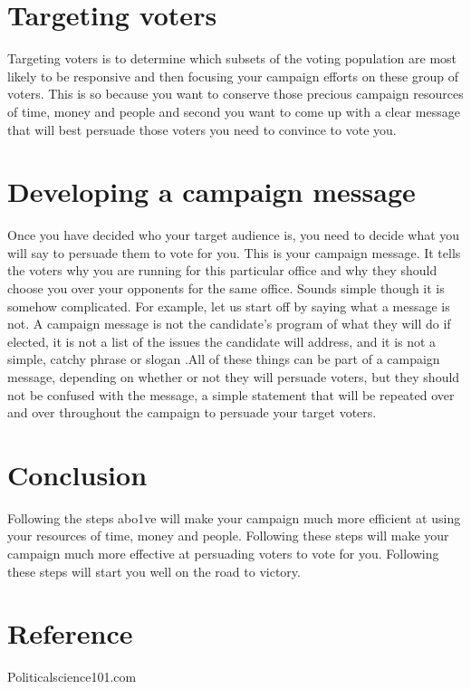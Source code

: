 \documentclass[options]{article}
\begin{document}
\section{\textbf{Targeting voters}}
Targeting voters is to determine which subsets of the voting population are most likely to be responsive and then focusing your campaign efforts on these group of voters. This is so because you want to conserve those precious campaign resources of time, money and people and second you want to come up with a clear message that will best persuade those voters you need to convince to vote you.
\section{\textbf{Developing a campaign message}}
Once you have decided who your target audience is, you need to decide what you will say to persuade them to vote for you. This is your campaign message. It tells the voters why you are running for this particular office and why they should choose you over your opponents for the same office. Sounds simple though it is somehow complicated. For example, let us start off by saying what a message is not. A campaign message is not the candidate's program of what they will do if elected, it is not a list of the issues the candidate will address, and it is not a simple, catchy phrase or slogan .All of these things can be part of a campaign message, depending on whether or not they will persuade voters, but they should not be confused with the message, a simple statement that will be repeated over and over throughout the campaign to persuade your target voters. 
\section{\textbf{Conclusion}}
Following the steps abo1ve will make your campaign much more efficient at using your resources of time, money and people. Following these steps will make your campaign much more effective at persuading voters to vote for you. Following these steps will start you well on the road to victory.
\section{\textbf{Reference}}
Politicalscience101.com
\end{document}
